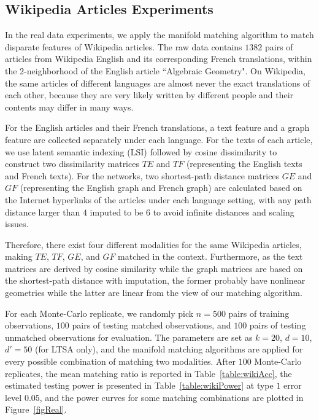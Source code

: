 \documentclass[times,twocolumn,final]{elsarticle}
\begin{document}
\subsection{Wikipedia Articles Experiments}
In the real data experiments, we apply the manifold matching algorithm to match disparate features of Wikipedia articles. The raw data contains $1382$ pairs of articles from Wikipedia English and its corresponding French translations, within the 2-neighborhood of the English article ``Algebraic Geometry". On Wikipedia, the same articles of different languages are almost never the exact translations of each other, because they are very likely written by different people and their contents may differ in many ways.

For the English articles and their French translations, a text feature and a graph feature are collected separately under each language. For the texts of each article, we use latent semantic indexing (LSI) \citep{DeerwesterDumais1990} followed by cosine dissimilarity to construct two dissimilarity matrices $TE$ and $TF$ (representing the English texts and French texts). For the networks, two shortest-path distance matrices $GE$ and $GF$ (representing the English graph and French graph) are calculated based on the Internet hyperlinks of the articles under each language setting, with any path distance larger than $4$ imputed to be $6$ to avoid infinite distances and scaling issues.

Therefore, there exist four different modalities for the same Wikipedia articles, making $TE$, $TF$, $GE$, and $GF$ matched in the context. Furthermore, as the text matrices are derived by cosine similarity while the graph matrices are based on the shortest-path distance with imputation, the former probably have nonlinear geometries while the latter are linear from the view of our matching algorithm.

For each Monte-Carlo replicate, we randomly pick $n=500$ pairs of training observations, $100$ pairs of testing matched observations, and $100$ pairs of testing unmatched observations for evaluation. The parameters are set as $k=20$, $d=10$, $d'=50$ (for LTSA only), and the manifold matching algorithms are applied for every possible combination of matching two modalities. After $100$ Monte-Carlo replicates, the mean matching ratio is reported in Table~\ref{table:wikiAcc}, the estimated testing power is presented in Table~\ref{table:wikiPower} at type $1$ error level $0.05$, and the power curves for some matching combinations are plotted in Figure~\ref{figReal}. 
\end{document}
